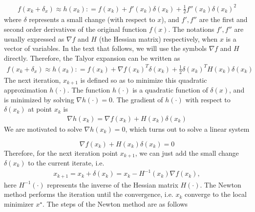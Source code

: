 \documentclass  [
  paper    = a4,
  BCOR     = 10mm,
  twoside,
  fontsize = 12pt,
  fleqn,
  toc      = bibnumbered,
  toc      = listofnumbered,
  numbers  = noendperiod,
  headings = normal,
  listof   = leveldown,
  version  = 3.03
]                                       {scrreprt}
\newcommand{\<}{\langle}
\renewcommand{\>}{\rangle}
\begin{document}
\begin{align*}
	f(x_k + \delta_x) \approx h(x_k) : = f(x_k) + f'(x_k)\delta(x_k) +\frac{1}{2}f''(x_k)\delta(x_k)^2 
\end{align*}
where $\delta$ represents a small change (with respect to $x$), and $f', f''$ are the first and second order derivatives of the original function $f(x)$. The notations $f', f''$ are usually expressed as $\nabla f$ and $H$ (the Hessian matrix) respectively, when $x$ is a vector of variables. In the text that follows, we will use the symbols $\nabla f$ and $H$ directly. Therefore, the Talyor expansion can be written as 
\begin{align*}
	f(x_k + \delta_x) \approx h(x_k) : = f(x_k) + \nabla f(x_k)^T\delta(x_k) +\frac{1}{2}\delta(x_k) ^TH(x_k)\delta(x_k) 
\end{align*}
The next iteration, $x_{k+1}$ is defined so as to minimize this quadratic approximation $h(\cdot)$. The function $h(\cdot)$ is a quadratic function of $\delta(x)$, and is minimized by solving $\nabla h(\cdot) = 0$. The gradient of $h(\cdot)$ with respect to $\delta(x_k)$ at point $x_k$ is
\begin{align*}
	\nabla h(x_k) = \nabla f(x_k) + H(x_k) \delta(x_k) 
\end{align*}
We are motivated to solve $\nabla h(x_k) =0$, which turns out to solve a linear system

\begin{equation}
	\nabla f(x_k) + H(x_k) \delta(x_k) =0
	\label{HessianEq}
\end{equation}
Therefore, for the next iteration point $x_{k+1}$, we can just add the small change $\delta(x_k)$ to the current iterate, i.e. 
\begin{align*}
	x_{k+1}  = x_k + \delta(x_k) = x_k - H^{-1}(x_k)\nabla f(x_k), 
\end{align*}
here $ H^{-1}(\cdot)$ represents the inverse of the Hessian matrix $H(\cdot)$. The Newton method performs the iteration until the convergence, i.e. $x_k$ converge to the local minimizer $x^\star$. The steps of the Newton method are as follows
\end{document}
